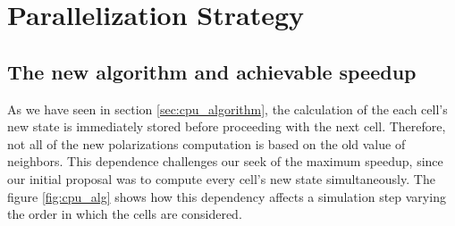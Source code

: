 \section{Parallelization Strategy}
\subsection{The new algorithm and achievable speedup}\label{sec:new_algorithm}
As we have seen in section \ref{sec:cpu_algorithm}, the calculation of the each cell's new state is immediately stored before proceeding with the next cell. Therefore, not all of the new polarizations computation is based on the old value of neighbors. This dependence challenges our seek of the maximum speedup, since our initial proposal was to compute every cell's new state simultaneously. The figure \ref{fig:cpu_alg} shows how this dependency affects a simulation step varying the order in which the cells are considered.
